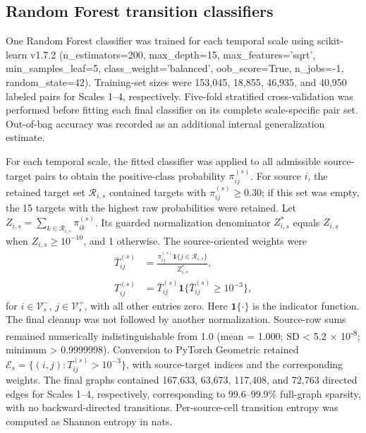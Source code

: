 \subsection*{Random Forest transition classifiers}

One Random Forest classifier was trained for each temporal scale using scikit-learn v1.7.2 \cite{ref117} (n\_estimators=200, max\_depth=15, max\_features='sqrt', min\_samples\_leaf=5, class\_weight='balanced', oob\_score=True, n\_jobs=-1, random\_state=42). Training-set sizes were 153,045, 18,855, 46,935, and 40,950 labeled pairs for Scales 1--4, respectively. Five-fold stratified cross-validation was performed before fitting each final classifier on its complete scale-specific pair set. Out-of-bag accuracy was recorded as an additional internal generalization estimate.

For each temporal scale, the fitted classifier was applied to all admissible source-target pairs to obtain the positive-class probability \(\pi_{ij}^{(s)}\). For source \(i\), the retained target set \(\mathcal R_{i,s}\) contained targets with \(\pi_{ij}^{(s)}\geq0.30\); if this set was empty, the 15 targets with the highest raw probabilities were retained. Let \(Z_{i,s}=\sum_{k\in\mathcal R_{i,s}}\pi_{ik}^{(s)}\). Its guarded normalization denominator \(Z_{i,s}^*\) equals \(Z_{i,s}\) when \(Z_{i,s}\geq10^{-10}\), and 1 otherwise. The source-oriented weights were
\begin{equation}\label{eq:rf-transitions}
\begin{aligned}
\bar T_{ij}^{(s)}
&=\frac{\pi_{ij}^{(s)}\mathbf1\{j\in\mathcal R_{i,s}\}}{Z_{i,s}^*},\\
T_{ij}^{(s)}
&=\bar T_{ij}^{(s)}\mathbf1\{\bar T_{ij}^{(s)}\geq10^{-3}\},
\end{aligned}
\end{equation}
for \(i\in\mathcal V_s^-\), \(j\in\mathcal V_s^+\), with all other entries zero. Here \(\mathbf1\{\cdot\}\) is the indicator function. The final cleanup was not followed by another normalization. Source-row sums remained numerically indistinguishable from 1.0 (mean = 1.000; SD < 5.2 \ensuremath{\times} 10\textsuperscript{-8}; minimum > 0.9999998). Conversion to PyTorch Geometric \cite{ref118} retained \(\mathcal E_s=\{(i,j):T_{ij}^{(s)}>10^{-3}\}\), with source-target indices and the corresponding weights. The final graphs contained 167,633, 63,673, 117,408, and 72,763 directed edges for Scales 1--4, respectively, corresponding to 99.6--99.9\% full-graph sparsity, with no backward-directed transitions. Per-source-cell transition entropy was computed as Shannon entropy in nats.

